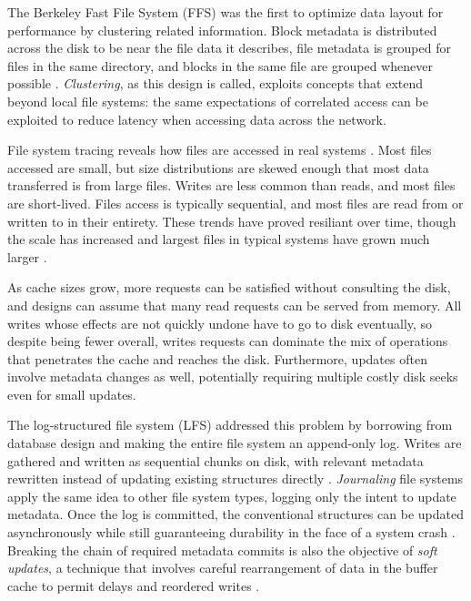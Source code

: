 The Berkeley Fast File System (FFS) was the first to optimize data layout for performance by clustering related information. Block metadata is distributed across the disk to be near the file data it describes, file metadata is grouped for files in the same directory, and blocks in the same file are grouped whenever possible \cite{mckusick}. \emph{Clustering}, as this design is called, exploits concepts that extend beyond local file systems: the same expectations of correlated access can be exploited to reduce latency when accessing data across the network.

File system tracing reveals how files are accessed in real systems \cite{ousterhout}. Most files accessed are small, but size distributions are skewed enough that most data transferred is from large files. Writes are less common than reads, and most files are short-lived. Files access is typically sequential, and most files are read from or written to in their entirety. These trends have proved resiliant over time, though the scale has increased and largest files in typical systems have grown much larger \cite{ruemmler,gibson98b}.

As cache sizes grow, more requests can be satisfied without consulting the disk, and designs can assume that many read requests can be served from memory. All writes whose effects are not quickly undone have to go to disk eventually, so despite being fewer overall, writes requests can dominate the mix of operations that penetrates the cache and reaches the disk. Furthermore, updates often involve metadata changes as well, potentially requiring multiple costly disk seeks even for small updates.

The log-structured file system (LFS) addressed this problem by borrowing from database design and making the entire file system an append-only log. Writes are gathered and written as sequential chunks on disk, with relevant metadata rewritten instead of updating existing structures directly \cite{rosenblum}. \emph{Journaling} file systems apply the same idea to other file system types, logging only the intent to update metadata. Once the log is committed, the conventional structures can be updated asynchronously while still guaranteeing durability in the face of a system crash \cite{hagmann,sweeney,tweedie}. Breaking the chain of required metadata commits is also the objective of \emph{soft updates}, a technique that involves careful rearrangement of data in the buffer cache to permit delays and reordered writes \cite{ganger94}.

